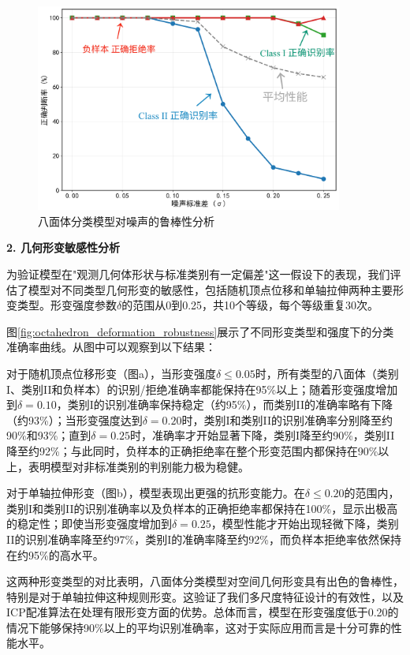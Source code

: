     \begin{figure}[H]
        \centering
    \includegraphics[width=0.9\textwidth]{figures2/robustness/octahedron_robustness_noise.png}
    \caption{八面体分类模型对噪声的鲁棒性分析}
    \label{fig:octahedron_noise_robustness}
    \end{figure}
    
\textbf{2. 几何形变敏感性分析}

为验证模型在"观测几何体形状与标准类别有一定偏差"这一假设下的表现，我们评估了模型对不同类型几何形变的敏感性，包括随机顶点位移和单轴拉伸两种主要形变类型。形变强度参数$\delta$的范围从0到0.25，共10个等级，每个等级重复30次。

图\ref{fig:octahedron_deformation_robustness}展示了不同形变类型和强度下的分类准确率曲线。从图中可以观察到以下结果：

对于随机顶点位移形变（图a），当形变强度$\delta \leq 0.05$时，所有类型的八面体（类别I、类别II和负样本）的识别/拒绝准确率都能保持在95\%以上；随着形变强度增加到$\delta = 0.10$，类别I的识别准确率保持稳定（约95\%），而类别II的准确率略有下降（约93\%）；当形变强度达到$\delta = 0.20$时，类别I和类别II的识别准确率分别降至约90\%和93\%；直到$\delta = 0.25$时，准确率才开始显著下降，类别I降至约90\%，类别II降至约92\%；与此同时，负样本的正确拒绝率在整个形变范围内都保持在90\%以上，表明模型对非标准类别的判别能力极为稳健。

对于单轴拉伸形变（图b），模型表现出更强的抗形变能力。在$\delta \leq 0.20$的范围内，类别I和类别II的识别准确率以及负样本的正确拒绝率都保持在100\%，显示出极高的稳定性；即使当形变强度增加到$\delta = 0.25$，模型性能才开始出现轻微下降，类别II的识别准确率降至约97\%，类别I的准确率降至约92\%，而负样本拒绝率依然保持在约95\%的高水平。

这两种形变类型的对比表明，八面体分类模型对空间几何形变具有出色的鲁棒性，特别是对于单轴拉伸这种规则形变。这验证了我们多尺度特征设计的有效性，以及ICP配准算法在处理有限形变方面的优势。总体而言，模型在形变强度低于0.20的情况下能够保持90\%以上的平均识别准确率，这对于实际应用而言是十分可靠的性能水平。
    
